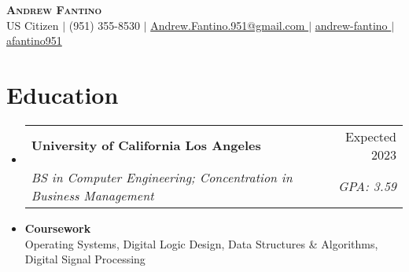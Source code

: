 \documentclass[letterpaper,11pt]{article}
\makeatletter
\newcommand{\resumeSubheading}[4]{
  \vspace{-2pt}\item
    \begin{tabular*}{0.97\textwidth}[t]{l@{\extracolsep{\fill}}r}
      \textbf{#1} & #2 \\
      \textit{\small#3} & \textit{\small #4} \\
    \end{tabular*}\vspace{-7pt}
}
\newcommand{\resumeSubHeadingListStart}{\begin{itemize}[leftmargin=0.15in, label={}]}
\newcommand{\resumeSubHeadingListEnd}{\end{itemize}}
\makeatother
\begin{document}
\begin{center}
  \textbf{\Huge \scshape Andrew Fantino} \\ \vspace{5pt}
  \small US Citizen $|$
  \small {} (951) 355-8530 $|$ 
  \href{mailto:andrew.fantino.951@gmail.com}{  Andrew.Fantino.951@gmail.com } $|$ 
  \href{https://linkedin.com/in/andrew-fantino/}{  andrew-fantino } $|$
  \href{https://github.com/afantino951}{  afantino951} 
\end{center}
\vspace*{-1.5em}

\section{Education}
  \resumeSubHeadingListStart
    \resumeSubheading
      {University of California Los Angeles}{Expected 2023}
      {BS in Computer Engineering; Concentration in Business Management}{GPA: 3.59}
      \vspace{-2pt}\item
      \textbf{Coursework} \\
        \small\quad Operating Systems, Digital Logic Design, Data Structures \& Algorithms, Digital Signal Processing
        

      \vspace{-7pt}

  \resumeSubHeadingListEnd

\end{document}
